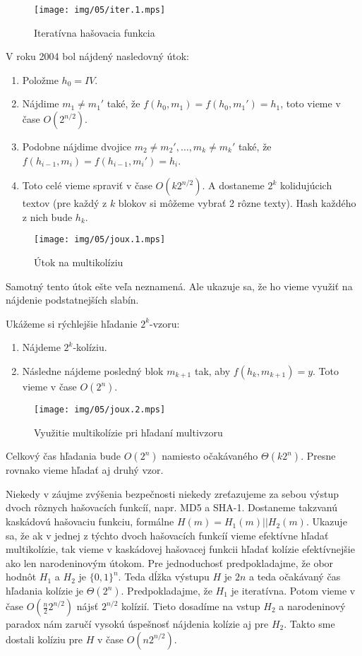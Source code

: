 \begin{figure}[h!]
    \label{fig:iter}
    \centering
    \texttt{[image: img/05/iter.1.mps]}
    \caption{Iteratívna hašovacia funkcia}
\end{figure}


V roku 2004 \cite{Joux04} bol nájdený nasledovný útok:
\begin{enumerate}
\itemsep -1.2mm
\item Položme $h_0 = IV$.
\item Nájdime $m_1 \neq m_1'$ také, že $f(h_0, m_1) = f(h_0, m_1') = h_1$, 
toto vieme v čase $O(2^{n/2})$.
\item Podobne nájdime dvojice $m_2 \neq m_2', \dots, m_k \neq m_k'$ také, 
že $f(h_{i-1}, m_i) = f(h_{i-1}, m_i') = h_i$.
\item Toto celé vieme spraviť v čase $O(k 2^{n/2})$. A dostaneme $2^k$ 
kolidujúcich textov (pre každý z $k$ blokov si môžeme vybrať
2 rôzne texty). Hash každého z nich bude $h_k$.
\end{enumerate}

\begin{figure}[h!]
    \label{fig:joux1}
    \centering
    \texttt{[image: img/05/joux.1.mps]}
    \caption{Útok na multikolíziu}
\end{figure}


Samotný tento útok ešte veľa neznamená. Ale ukazuje sa, že
ho vieme využiť na nájdenie podstatnejších slabín.

Ukážeme si rýchlejšie hľadanie $2^k$-vzoru:
\begin{enumerate}
\itemsep -1.2mm
\item Nájdeme $2^k$-kolíziu.
\item Následne nájdeme posledný blok $m_{k+1}$ tak, aby $f(h_k, m_{k+1}) = y$. Toto vieme v čase $O(2^n)$.
\end{enumerate}

\begin{figure}[h!]
    \label{fig:joux2}
    \centering
    \texttt{[image: img/05/joux.2.mps]}
    \caption{Využitie multikolízie pri hľadaní multivzoru}
\end{figure}

Celkový čas hľadania bude $O(2^n)$ namiesto očakávaného $\Theta(k 2^n)$. Presne rovnako vieme hľadať aj druhý vzor.

Niekedy v záujme zvýšenia bezpečnosti niekedy zreťazujeme za sebou výstup dvoch rôznych hašovacích funkcíí, napr.
MD5 a SHA-1. Dostaneme takzvanú kaskádovú hašovaciu funkciu, formálne $H(m) = H_1(m)||H_2(m)$. 
Ukazuje sa, že ak v jednej z týchto dvoch hašovacích funkcíí vieme efektívne hľadať multikolízie, tak vieme
v kaskádovej hašovacej funkcii hľadať kolízie efektívnejšie ako len narodeninovým útokom.
Pre jednoduchosť predpokladajme, že obor hodnôt $H_1$
a $H_2$ je $\{0,1\}^n$. Teda dĺžka výstupu $H$ je $2n$ a teda očakávaný čas hľadania kolízie je $\Theta(2^n)$.
Predpokladajme, že $H_1$ je iteratívna. Potom vieme v čase $O(\frac{n}{2} 2^{n/2})$ nájsť $2^{n/2}$ kolízií. Tieto dosadíme
na vstup $H_2$ a narodeninový paradox nám zaručí vysokú úspešnosť nájdenia kolízie aj pre $H_2$. Takto sme dostali
kolíziu pre $H$ v čase $O(n 2^{n/2})$.

